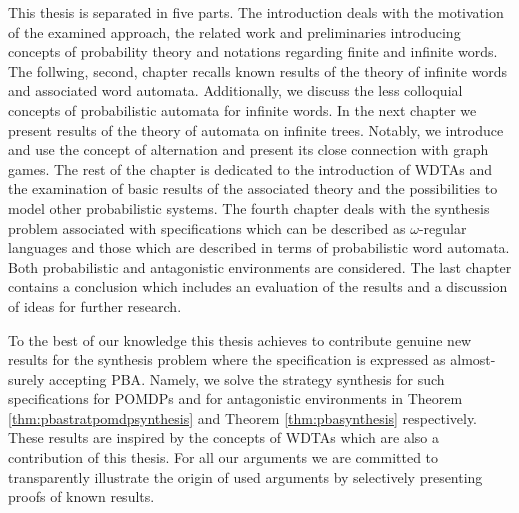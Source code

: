 This thesis is separated in five parts. The introduction deals with the
motivation of the examined approach, the related work and preliminaries
introducing concepts of probability theory and notations regarding finite and
infinite words. The follwing, second, chapter recalls known results of the
theory of infinite words and associated word automata. Additionally, we discuss
the less colloquial concepts of probabilistic automata for infinite words. In
the next chapter we present results of the theory of automata on infinite
trees. Notably, we introduce and use the concept of alternation and present its
close connection with graph games. The rest of the chapter is dedicated to the
introduction of \aclp*{WDTA} and the examination of basic results of the
associated theory and the possibilities to model other probabilistic systems.
The fourth chapter deals with the synthesis problem associated with
specifications which can be described as $\omega$-regular languages and those
which are described in terms of probabilistic word automata. Both probabilistic
and antagonistic environments are considered. The last chapter contains a
conclusion which includes an evaluation of the results and a discussion of
ideas for further research.

To the best of our knowledge this thesis achieves to contribute genuine new
results for the synthesis problem where the specification is expressed as
almost-surely accepting \acl*{PBA}. Namely, we solve the strategy synthesis for
such specifications for \aclp*{POMDP} and for antagonistic environments in
Theorem \ref{thm:pbastratpomdpsynthesis} and Theorem \ref{thm:pbasynthesis}
respectively. These results are inspired by the concepts of \aclp*{WDTA} which
are also a contribution of this thesis. For all our arguments we are committed
to transparently illustrate the origin of used arguments by selectively
presenting proofs of known results.
